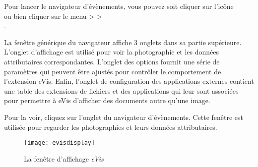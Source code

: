 Pour lancer le navigateur d'évènements, vous pouvez soit cliquer sur l'icône\\  ou bien cliquer sur le menu  >  >\\ .


La fenêtre générique du navigateur affiche 3 onglets dans sa partie supérieure. L'onglet d'affichage est utilisé pour voir la photographie et les données attributaires correspondantes. L'onglet des options fournit une série de paramètres qui peuvent être ajustés pour contrôler le comportement de l'extension eVis. Enfin, l'onglet de configuration des applications externes contient une table des extensions de fichiers et des applications qui leur sont associées pour permettre à eVis d'afficher des documents autre qu'une image.

\label{evis_display_window}

Pour la voir, cliquez sur l'onglet  du navigateur d'évènements. Cette fenêtre est utilisée pour regarder les photographies et leurs données attributaires.

\begin{figure}[ht]
   \begin{center}
\texttt{[image: evisdisplay]}
\caption{La fenêtre d'affichage \emph{eVis} \nixcaption}\label{evisdisplay}
\end{center}
\end{figure}

